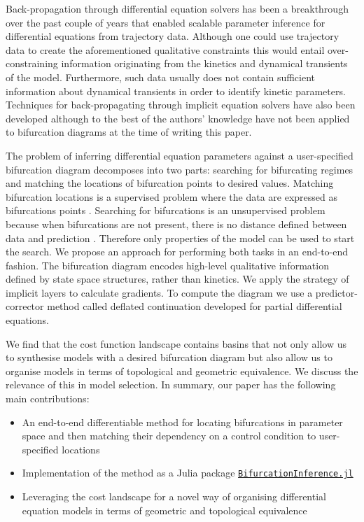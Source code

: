 \documentclass{article}
\begin{document}
Back-propagation through differential equation solvers has been a breakthrough over the past couple of years \cite{Chen2018NeuralEquations,Rackauckas2019DiffEqFlux.jlEquations} that enabled scalable parameter inference for differential equations from trajectory data. Although one could use trajectory data to create the aforementioned qualitative constraints \cite{Ranciati2017BayesianParameters,Khadivar2021LearningBifurcations} this would entail over-constraining information originating from the kinetics and dynamical transients of the model. Furthermore, such data usually does not contain sufficient information about dynamical transients in order to identify kinetic parameters. Techniques for back-propagating through implicit equation solvers have also been developed \cite{Look2020DifferentiableLayers,Bai2019DeepModels} although to the best of the authors' knowledge have not been applied to bifurcation diagrams at the time of writing this paper.

The problem of inferring differential equation parameters against a user-specified bifurcation diagram decomposes into two parts: searching for bifurcating regimes and matching the locations of bifurcation points to desired values. Matching bifurcation locations is a supervised problem where the data are expressed as bifurcations points \cite{Lu2006InverseSystems,Conrad2006BifurcationClock}. Searching for bifurcations is an unsupervised problem because when bifurcations are not present, there is no distance defined between data and prediction \cite{Chickarmane2005BifurcationTool}. Therefore only properties of the model can be used to start the search. We propose an approach for performing both tasks in an end-to-end fashion. The bifurcation diagram encodes high-level qualitative information defined by state space structures, rather than kinetics. We apply the strategy of implicit layers \cite{Look2020DifferentiableLayers,Bai2019DeepModels} to calculate gradients. To compute the diagram we use a predictor-corrector method called deflated continuation \cite{Farrell2016TheDiagrams,Veltz2020BifurcationKit.jl} developed for partial differential equations.

We find that the cost function landscape contains basins that not only allow us to synthesise models with a desired bifurcation diagram but also allow us to organise models in terms of topological and geometric equivalence. We discuss the relevance of this in model selection. In summary, our paper has the following main contributions:

\begin{itemize}
    \item An end-to-end differentiable method for locating bifurcations in parameter space and then matching their dependency on a control condition to user-specified locations
    \item Implementation of the method as a Julia package
\href{https://github.com/gszep/BifurcationInference.jl}{\texttt{BifurcationInference.jl}}
    \item Leveraging the cost landscape for a novel way of organising differential equation models in terms of geometric and topological equivalence
\end{itemize}
\end{document}
